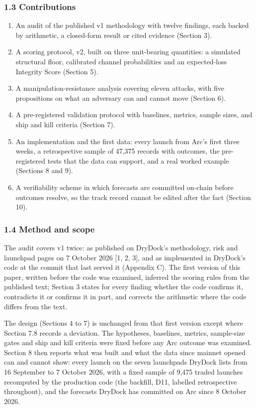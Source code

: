 \subsubsection{1.3 Contributions}\label{contributions}

\begin{enumerate}
\def\labelenumi{\arabic{enumi}.}
\tightlist
\item
  An audit of the published v1 methodology with twelve findings, each backed by arithmetic, a closed-form result or cited evidence (Section 3).
\item
  A scoring protocol, v2, built on three unit-bearing quantities: a simulated structural floor, calibrated channel probabilities and an expected-loss Integrity Score (Section 5).
\item
  A manipulation-resistance analysis covering eleven attacks, with five propositions on what an adversary can and cannot move (Section 6).
\item
  A pre-registered validation protocol with baselines, metrics, sample sizes, and ship and kill criteria (Section 7).
\item
  An implementation and the first data: every launch from Arc's first three weeks, a retrospective sample of 47,375 records with outcomes, the pre-registered tests that the data can support, and a real worked example (Sections 8 and 9).
\item
  A verifiability scheme in which forecasts are committed on-chain before outcomes resolve, so the track record cannot be edited after the fact (Section 10).
\end{enumerate}

\subsubsection{1.4 Method and scope}\label{method-and-scope}

The audit covers v1 twice: as published on DryDock's methodology, risk and launchpad pages on 7 October 2026 {[}1, 2, 3{]}, and as implemented in DryDock's code at the commit that last served it (Appendix C). The first version of this paper, written before the code was examined, inferred the scoring rules from the published text; Section 3 states for every finding whether the code confirms it, contradicts it or confirms it in part, and corrects the arithmetic where the code differs from the text.

The design (Sections 4 to 7) is unchanged from that first version except where Section 7.8 records a deviation. The hypotheses, baselines, metrics, sample-size gates and ship and kill criteria were fixed before any Arc outcome was examined. Section 8 then reports what was built and what the data since mainnet opened can and cannot show: every launch on the seven launchpads DryDock lists from 16 September to 7 October 2026, with a fixed sample of 9,475 traded launches recomputed by the production code (the backfill, D11, labelled retrospective throughout), and the forecasts DryDock has committed on Arc since 8 October 2026.

